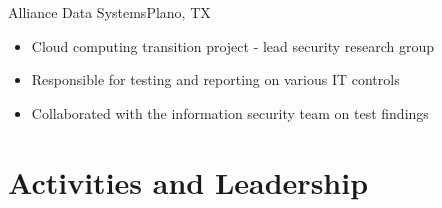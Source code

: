 \documentclass[11pt,a4paper,sans]{moderncv}
\newcommand{\spacing}{4pt}
\begin{document}
\vspace{\spacing}

  {Alliance Data Systems}{Plano, TX}{}{\vspace{3pt}
    \begin{itemize}
      \setlength{\itemindent}{1em}
      \item Cloud computing transition project - lead security research group
      \item Responsible for testing and reporting on various IT controls
      \item Collaborated with the information security team on test findings
    \end{itemize}
    }

\section{Activities and Leadership}

\vspace{\spacing}

\addvspace{-1em}


\addvspace{-1.25em}


\addvspace{-1.25em}





%
%
%
%


%
%

\end{document}
